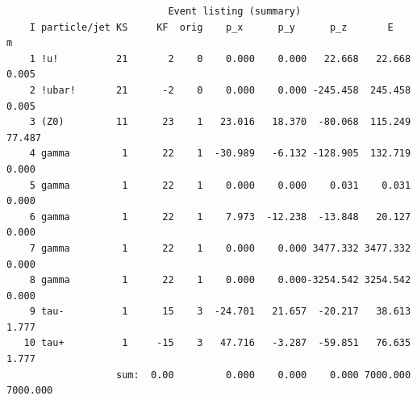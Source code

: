 \documentclass{beamer}
\begin{document}
\begin{frame}[fragile]
{\begin{verbatim}
                            Event listing (summary)
    I particle/jet KS     KF  orig    p_x      p_y      p_z       E        m
    1 !u!          21       2    0    0.000    0.000   22.668   22.668    0.005
    2 !ubar!       21      -2    0    0.000    0.000 -245.458  245.458    0.005
    3 (Z0)         11      23    1   23.016   18.370  -80.068  115.249   77.487
    4 gamma         1      22    1  -30.989   -6.132 -128.905  132.719    0.000
    5 gamma         1      22    1    0.000    0.000    0.031    0.031    0.000
    6 gamma         1      22    1    7.973  -12.238  -13.848   20.127    0.000
    7 gamma         1      22    1    0.000    0.000 3477.332 3477.332    0.000
    8 gamma         1      22    1    0.000    0.000-3254.542 3254.542    0.000
    9 tau-          1      15    3  -24.701   21.657  -20.217   38.613    1.777
   10 tau+          1     -15    3   47.716   -3.287  -59.851   76.635    1.777
                   sum:  0.00         0.000    0.000    0.000 7000.000 7000.000
\end{verbatim}
}%
\end{frame}
\end{document}
